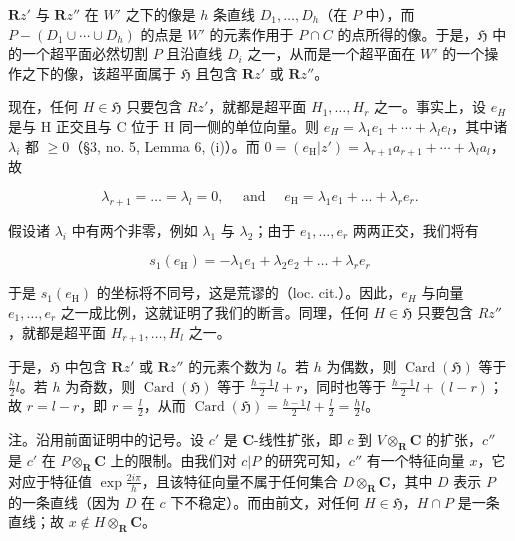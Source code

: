 \(\mathbf{R}z'\) 与 \(\mathbf{R}z''\) 在 \(W'\) 之下的像是 \(h\) 条直线 \(D_1, \ldots, D_h\)（在 \(P\) 中），而 \(P - (D_1 \cup \cdots \cup D_h)\) 的点是 \(W'\) 的元素作用于 \(P \cap C\) 的点所得的像。于是，\(\mathfrak{H}\) 中的一个超平面必然切割 \(P\) 且沿直线 \(D_i\) 之一，从而是一个超平面在 \(W'\) 的一个操作之下的像，该超平面属于 \(\mathfrak{H}\) 且包含 \(\mathbf{R}z'\) 或 \(\mathbf{R}z''\)。

现在，任何 \(H \in \mathfrak{H}\) 只要包含 \(Rz'\)，就都是超平面 \(H_{1}, \ldots, H_{r}\) 之一。事实上，设 \(e_{H}\) 是与 H 正交且与 C 位于 H 同一侧的单位向量。则 \(e_{H} = \lambda_{1}e_{1} + \cdots + \lambda_{l}e_{l}\)，其中诸 \(\lambda_{i}\) 都 \(\geqslant 0\)（§3, no. 5, Lemma 6, (i)）。而 \(0 = (e_{\mathrm{H}}|z') = \lambda_{r+1}a_{r+1} + \cdots + \lambda_{l}a_{l}\)，故

\[
\lambda_ {r + 1} = \dots = \lambda_ {l} = 0, \quad \text { and } \quad e _ {\mathrm{H}} = \lambda_ {1} e _ {1} + \dots + \lambda_ {r} e _ {r}.
\]

假设诸 \(\lambda_{i}\) 中有两个非零，例如 \(\lambda_{1}\) 与 \(\lambda_{2}\)；由于 \(e_{1},\ldots,e_{r}\) 两两正交，我们将有

\[
s _ {1} (e _ {\mathrm{H}}) = - \lambda_ {1} e _ {1} + \lambda_ {2} e _ {2} + \dots + \lambda_ {r} e _ {r}
\]

于是 \(s_{1}(e_{\mathrm{H}})\) 的坐标将不同号，这是荒谬的（loc. cit.）。因此，\(e_{H}\) 与向量 \(e_{1},\ldots,e_{r}\) 之一成比例，这就证明了我们的断言。同理，任何 \(H\in \mathfrak{H}\) 只要包含 \(Rz''\)，就都是超平面 \(H_{r+1},\ldots,H_{l}\) 之一。

于是，\(\mathfrak{H}\) 中包含 \(\mathbf{R}z'\) 或 \(\mathbf{R}z''\) 的元素个数为 \(l\)。若 \(h\) 为偶数，则 \(\operatorname{Card}(\mathfrak{H})\) 等于 \(\frac{h}{2} l\)。若 \(h\) 为奇数，则 \(\operatorname{Card}(\mathfrak{H})\) 等于 \(\frac{h - 1}{2} l + r\)，同时也等于 \(\frac{h - 1}{2} l + (l - r)\)；故 \(r = l - r\)，即 \(r = \frac{l}{2}\)，从而 \(\operatorname{Card}(\mathfrak{H}) = \frac{h - 1}{2} l + \frac{l}{2} = \frac{h}{2} l\)。

注。沿用前面证明中的记号。设 \(c'\) 是 \(\mathbf{C}\)-线性扩张，即 \(c\) 到 \(V \otimes_{\mathbf{R}} \mathbf{C}\) 的扩张，\(c''\) 是 \(c'\) 在 \(P \otimes_{\mathbf{R}} \mathbf{C}\) 上的限制。由我们对 \(c|P\) 的研究可知，\(c''\) 有一个特征向量 \(x\)，它对应于特征值 \(\exp \frac{2i\pi}{h}\)，且该特征向量不属于任何集合 \(D \otimes_{\mathbf{R}} \mathbf{C}\)，其中 \(D\) 表示 \(P\) 的一条直线（因为 \(D\) 在 \(c\) 下不稳定）。而由前文，对任何 \(H \in \mathfrak{H}\)，\(H \cap P\) 是一条直线；故 \(x \notin H \otimes_{\mathbf{R}} \mathbf{C}\)。

